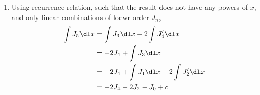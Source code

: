 \begin{enumerate}
    \item Using recurrence relation, such that the result does not have any powers of
    $ x $, and only linear combinations of loewr order $ J_n $,
          \begin{align}
              \int J_5 \dl x & = \int J_3 \dl x - 2 \int J_4' \dl x         \\
                             & = -2J_4 + \int J_3 \dl x                     \\
                             & = -2J_4 + \int J_1 \dl x - 2 \int J_2' \dl x \\
                             & = -2J_4 - 2J_2 - J_0 + c
          \end{align}
\end{enumerate}